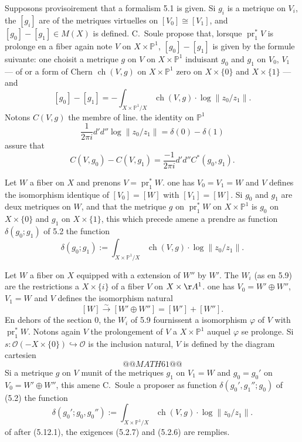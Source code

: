 \documentclass[12pt,a4paper]{article}
\theoremstyle{plain}
\theoremstyle{definition}
\DeclareMathOperator{\ch}{ch}
\DeclareMathOperator{\pr}{pr}
\newcommand{\PP}{\mathbb{P}}
\newcommand{\Oo}{\mathscr{O}}
\begin{document}
Supposons provisoirement that a formalism 5.1 is given. Si $g_i$ is a
metrique on $V_i$, the $[g_i]$ are of the metriques virtuelles on $[V_0] \cong [V_1]$,
and $[g_0] - [g_1] \in M(X)$ is defined. C.~Soule propose that, lorsque $\pr_1^* V$ is prolonge
en a fiber again note $V$ on $X \times \PP^1$, $[g_0] - [g_1]$ is given by the formule
suivante: one choisit a metrique $g$ on $V$ on $X \times \PP^1$ induisant $g_0$ and
$g_1$ on $V_0$, $V_1$ --- of or a form of Chern $\ch(V, g)$ on $X \times \PP^1$ zero on
$X \times \{0\}$ and $X \times \{1\}$ --- and
\begin{equation}\label{eq:5.12.1}
[g_0] - [g_1] = -\int_{X \times \PP^1/X} \ch(V, g) \cdot \log\|z_0/z_1\| .
\end{equation}
Notons $C(V, g)$ the membre of line. the identity on $\PP^1$
\[
\frac{1}{2\pi i} d'd'' \log\|z_0/z_1\| = \delta(0) - \delta(1)
\]
assure that
\begin{equation}\label{eq:5.12.2}
C(V, g_0) - C(V, g_1) = \frac{-1}{2\pi i} d'd'' C^*(g_0, g_1) .
\end{equation}

Let $W$ a fiber on $X$ and prenons $V = \pr_1^* W$. one has $V_0 = V_1 = W$ and
$V$ defines the isomorphism identique of $[V_0] = [W]$ with $[V_1] = [W]$. Si $g_0$
and $g_1$ are deux metriques on $W$, and that the metrique $g$ on $\pr_1^* W$ on $X \times \PP^1$
is $g_0$ on $X \times \{0\}$ and $g_1$ on $X \times \{1\}$, this which precede amene a prendre as function $\delta(g_0; g_1)$ of 5.2 the function
\begin{equation}\label{eq:5.12.3}
\delta(g_0; g_1) := \int_{X \times \PP^1/X} \ch(V, g) \cdot \log\|z_0/z_1\| .
\end{equation}

Let $W$ a fiber on $X$ equipped with a extension of $W''$ by $W'$. The $W_i$ (as en
5.9) are the restrictions a $X \times \{i\}$ of a fiber $V$ on $X \times \AA^1$. one has $V_0 =
W' \oplus W''$, $V_1 = W$ and $V$ defines the isomorphism natural
\[
[W] \xrightarrow{\sim} [W' \oplus W''] = [W'] + [W''] .
\]
En dehors of the section $0$, the $W_i$ of 5.9 fournissent a isomorphism $\varphi$ of
$V$ with $\pr_1^* W$. Notons again $V$ the prolongement of $V$ a $X \times \PP^1$ auquel
$\varphi$ se prolonge. Si $s: \Oo(-X \times \{0\}) \hookrightarrow \Oo$ is the inclusion natural, $V$ is defined
by the diagram cartesien
\[
@@MATH61@@
\]
Si a metrique $g$ on $V$ munit of the metriques $g_1$ on $V_1 = W$ and $g_0 =
g_0'$ on $V_0 = W' \oplus W''$, this amene C.~Soule a proposer as function $\delta(g_0', g_1'';
g_0)$ of (5.2) the function
\begin{equation}\label{eq:5.12.4}
\delta(g_0'; g_0, g_0'') := \int_{X \times \PP^1/X} \ch(V, g) \cdot \log\|z_0/z_1\| .
\end{equation}
of after (5.12.1), the exigences (5.2.7) and (5.2.6) are remplies.
\end{document}
